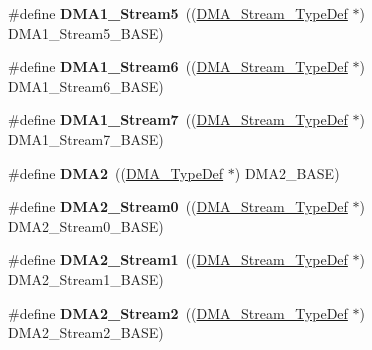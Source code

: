 \begin{DoxyCompactItemize}
\item 
\mbox{\label{group___peripheral__declaration_gac3abc20f80e25c19b02104ad34eae652}} 
\#define {\bfseries D\+M\+A1\+\_\+\+Stream5}~((\hyperlink{struct_d_m_a___stream___type_def}{D\+M\+A\+\_\+\+Stream\+\_\+\+Type\+Def} $\ast$) D\+M\+A1\+\_\+\+Stream5\+\_\+\+B\+A\+SE)
\item 
\mbox{\label{group___peripheral__declaration_gac95127480470900755953f1cfe68567d}} 
\#define {\bfseries D\+M\+A1\+\_\+\+Stream6}~((\hyperlink{struct_d_m_a___stream___type_def}{D\+M\+A\+\_\+\+Stream\+\_\+\+Type\+Def} $\ast$) D\+M\+A1\+\_\+\+Stream6\+\_\+\+B\+A\+SE)
\item 
\mbox{\label{group___peripheral__declaration_ga8ecdeaf43d0f4207dab1fdb4d7bf8d26}} 
\#define {\bfseries D\+M\+A1\+\_\+\+Stream7}~((\hyperlink{struct_d_m_a___stream___type_def}{D\+M\+A\+\_\+\+Stream\+\_\+\+Type\+Def} $\ast$) D\+M\+A1\+\_\+\+Stream7\+\_\+\+B\+A\+SE)
\item 
\mbox{\label{group___peripheral__declaration_ga506520140eec1708bc7570c49bdf972d}} 
\#define {\bfseries D\+M\+A2}~((\hyperlink{struct_d_m_a___type_def}{D\+M\+A\+\_\+\+Type\+Def} $\ast$) D\+M\+A2\+\_\+\+B\+A\+SE)
\item 
\mbox{\label{group___peripheral__declaration_ga3a2efe5fd7a7a79be3b08a1670bbd016}} 
\#define {\bfseries D\+M\+A2\+\_\+\+Stream0}~((\hyperlink{struct_d_m_a___stream___type_def}{D\+M\+A\+\_\+\+Stream\+\_\+\+Type\+Def} $\ast$) D\+M\+A2\+\_\+\+Stream0\+\_\+\+B\+A\+SE)
\item 
\mbox{\label{group___peripheral__declaration_gae96f15d34d3c41c16fce69bc2878151a}} 
\#define {\bfseries D\+M\+A2\+\_\+\+Stream1}~((\hyperlink{struct_d_m_a___stream___type_def}{D\+M\+A\+\_\+\+Stream\+\_\+\+Type\+Def} $\ast$) D\+M\+A2\+\_\+\+Stream1\+\_\+\+B\+A\+SE)
\item 
\mbox{\label{group___peripheral__declaration_ga71bb410664b861ff0520f08976e24ee1}} 
\#define {\bfseries D\+M\+A2\+\_\+\+Stream2}~((\hyperlink{struct_d_m_a___stream___type_def}{D\+M\+A\+\_\+\+Stream\+\_\+\+Type\+Def} $\ast$) D\+M\+A2\+\_\+\+Stream2\+\_\+\+B\+A\+SE)

\end{DoxyCompactItemize}
